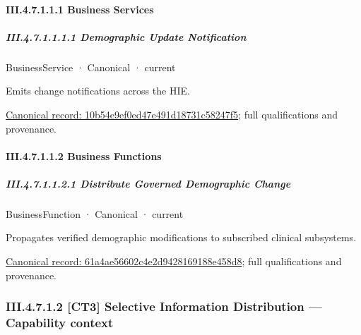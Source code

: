 \paragraph*{III.4.7.1.1.1 Business Services}
\label{navigation:III.4.7.1.1.1}

\subparagraph*{III.4.7.1.1.1.1 Demographic Update Notification}
\label{navigation:III.4.7.1.1.1.1}

\label{element:10b54e9ef0ed47e491d18731c58247f5}
{\small BusinessService · Canonical · current}\par

Emits change notifications across the HIE.


{\footnotesize \href{../../../../../../../continuum/business/business-service/10b54e9ef0ed47e491d18731c58247f5.md}{Canonical record: 10b54e9ef0ed47e491d18731c58247f5}; full qualifications and provenance.}\par
\paragraph*{III.4.7.1.1.2 Business Functions}
\label{navigation:III.4.7.1.1.2}

\subparagraph*{III.4.7.1.1.2.1 Distribute Governed Demographic Change}
\label{navigation:III.4.7.1.1.2.1}

\label{element:61a4ae56602c4e2d9428169188e458d8}
{\small BusinessFunction · Canonical · current}\par

Propagates verified demographic modifications to subscribed clinical subsystems.


{\footnotesize \href{../../../../../../../continuum/business/business-function/61a4ae56602c4e2d9428169188e458d8.md}{Canonical record: 61a4ae56602c4e2d9428169188e458d8}; full qualifications and provenance.}\par
\subsubsection*{III.4.7.1.2 [CT3] Selective Information Distribution — Capability context}
\label{navigation:III.4.7.1.2}

